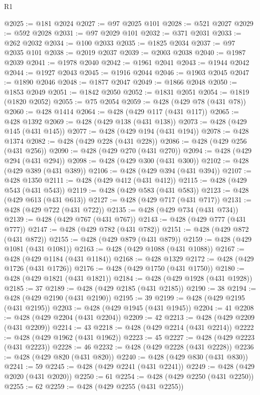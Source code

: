 \begin{lexlean}{R1}
\begin{coremodule}
@2025 := @181 @2024
@2027 := @97 @2025 @101
@2028 := @521 @2027
@2029 := @592 @2028
@2031 := @97 @2029 @101
@2032 := @371 @2031
@2033 := @262 @2032
@2034 := @100 @2033
@2035 := @1825 @2034
@2037 := @97 @2035 @101
@2038 := @2019 @2037
@2039 := @2003 @2038
@2040 := @1987 @2039
@2041 := @1978 @2040
@2042 := @1961 @2041
@2043 := @1944 @2042
@2044 := @1927 @2043
@2045 := @1916 @2044
@2046 := @1903 @2045
@2047 := @1890 @2046
@2048 := @1877 @2047
@2049 := @1866 @2048
@2050 := @1853 @2049
@2051 := @1842 @2050
@2052 := @1831 @2051
@2054 := @1819 (@1820 @2052)
@2055 := @75 @2054
@2059 := @428 (@429 @78 (@431 @78))
@2060 := @428 @1414
@2064 := @428 (@429 @117 (@431 @117))
@2065 := @428 @1392
@2069 := @428 (@429 @138 (@431 @138))
@2073 := @428 (@429 @145 (@431 @145))
@2077 := @428 (@429 @194 (@431 @194))
@2078 := @428 @1374
@2082 := @428 (@429 @228 (@431 @228))
@2086 := @428 (@429 @256 (@431 @256))
@2090 := @428 (@429 @270 (@431 @270))
@2094 := @428 (@429 @294 (@431 @294))
@2098 := @428 (@429 @300 (@431 @300))
@2102 := @428 (@429 @389 (@431 @389))
@2106 := @428 (@429 @394 (@431 @394))
@2107 := @428 @1350
@2111 := @428 (@429 @412 (@431 @412))
@2115 := @428 (@429 @543 (@431 @543))
@2119 := @428 (@429 @583 (@431 @583))
@2123 := @428 (@429 @613 (@431 @613))
@2127 := @428 (@429 @717 (@431 @717))
@2131 := @428 (@429 @722 (@431 @722))
@2135 := @428 (@429 @734 (@431 @734))
@2139 := @428 (@429 @767 (@431 @767))
@2143 := @428 (@429 @777 (@431 @777))
@2147 := @428 (@429 @782 (@431 @782))
@2151 := @428 (@429 @872 (@431 @872))
@2155 := @428 (@429 @879 (@431 @879))
@2159 := @428 (@429 @1081 (@431 @1081))
@2163 := @428 (@429 @1088 (@431 @1088))
@2167 := @428 (@429 @1184 (@431 @1184))
@2168 := @428 @1329
@2172 := @428 (@429 @1726 (@431 @1726))
@2176 := @428 (@429 @1750 (@431 @1750))
@2180 := @428 (@429 @1821 (@431 @1821))
@2184 := @428 (@429 @1928 (@431 @1928))
@2185 := 37
@2189 := @428 (@429 @2185 (@431 @2185))
@2190 := 38
@2194 := @428 (@429 @2190 (@431 @2190))
@2195 := 39
@2199 := @428 (@429 @2195 (@431 @2195))
@2203 := @428 (@429 @1945 (@431 @1945))
@2204 := 41
@2208 := @428 (@429 @2204 (@431 @2204))
@2209 := 42
@2213 := @428 (@429 @2209 (@431 @2209))
@2214 := 43
@2218 := @428 (@429 @2214 (@431 @2214))
@2222 := @428 (@429 @1962 (@431 @1962))
@2223 := 45
@2227 := @428 (@429 @2223 (@431 @2223))
@2228 := 46
@2232 := @428 (@429 @2228 (@431 @2228))
@2236 := @428 (@429 @820 (@431 @820))
@2240 := @428 (@429 @830 (@431 @830))
@2241 := 59
@2245 := @428 (@429 @2241 (@431 @2241))
@2249 := @428 (@429 @2020 (@431 @2020))
@2250 := 61
@2254 := @428 (@429 @2250 (@431 @2250))
@2255 := 62
@2259 := @428 (@429 @2255 (@431 @2255))

\end{coremodule}
\end{lexlean}

